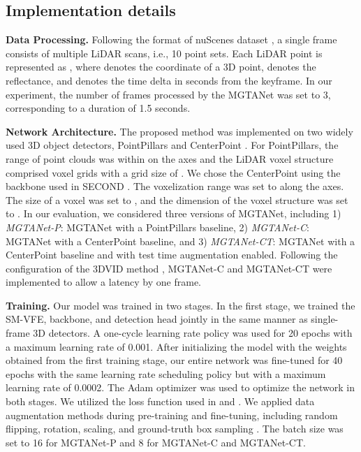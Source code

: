 \documentclass[letterpaper]{article} \usepackage{aaai23}  \usepackage{times}  \usepackage{helvet}  \usepackage{courier}  \usepackage[hyphens]{url}  \usepackage{graphicx} \urlstyle{rm} \def\UrlFont{\rm}  \usepackage{natbib}  \usepackage{caption} \frenchspacing  \setlength{\pdfpagewidth}{8.5in} \usepackage{algorithm}
\begin{document}
\subsection{Implementation details}
{\bf Data Processing.} Following the format of nuScenes dataset \cite{nuscenes}, a single frame consists of  multiple LiDAR scans, i.e., 10 point sets. Each LiDAR point is represented as , where  denotes the coordinate of a 3D point,  denotes the reflectance, and  denotes the time delta in seconds from the keyframe. In our experiment, the number of frames   processed by the MGTANet was set to 3, corresponding to a duration of 1.5 seconds. 

\noindent
\textbf{Network Architecture.}
The proposed method was implemented on two widely used 3D object detectors, PointPillars \cite{pointpillars} and CenterPoint \cite{centerpoint}. For PointPillars, the range of point clouds was within  on the  axes and the LiDAR voxel structure comprised  voxel grids with a grid size of . We chose the CenterPoint \cite{centerpoint} using the backbone used in SECOND \cite{second}. The voxelization range was set to  along the  axes. The size of a voxel was set to , and the dimension of the voxel structure was set to .
In our evaluation, we considered three versions of MGTANet, including 1) {\it MGTANet-P}: MGTANet with a PointPillars baseline, 2) {\it MGTANet-C}: MGTANet with a CenterPoint baseline, and 3) {\it MGTANet-CT}: MGTANet with a CenterPoint baseline and with test time augmentation \cite{tta} enabled. Following the configuration of the 3DVID method \cite{3DVID_TPAMI}, MGTANet-C and MGTANet-CT were implemented to allow a latency by one frame.

\noindent
{\bf Training.} Our model was trained in two stages. In the first stage, we trained the SM-VFE, backbone, and detection head jointly in the same manner as single-frame 3D detectors. A one-cycle learning rate policy was used for 20 epochs with a maximum learning rate of 0.001. After initializing the model with the weights obtained from the first training stage, our entire network was fine-tuned for 40 epochs with the same learning rate scheduling policy but with a maximum learning rate of 0.0002. The Adam optimizer was used to optimize the network in both stages. We utilized the loss function used in \cite{pointpillars} and \cite{centerpoint}. We applied data augmentation methods during pre-training and fine-tuning, including random flipping, rotation, scaling, and ground-truth box sampling \cite{second}. The batch size was set to 16 for MGTANet-P and 8 for MGTANet-C and MGTANet-CT.
\end{document}
